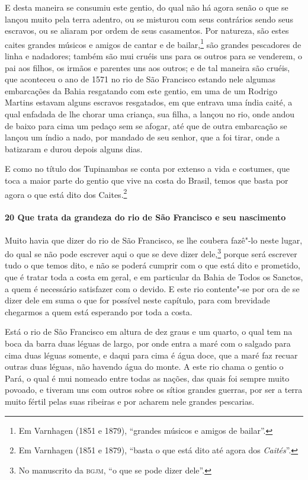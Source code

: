 \begin{linenumbers}
E desta maneira se consumiu este gentio, do qual não há agora senão o que se lançou muito
pela terra adentro, ou se misturou com seus contrários sendo seus escravos, ou se aliaram
por ordem de seus casamentos. Por natureza, são estes caites grandes músicos e amigos de
cantar e de bailar,\footnote{ Em Varnhagen (1851 e 1879), ``grandes músicos e amigos de
bailar''.} são grandes pescadores de linha e nadadores; também são mui cruéis uns para os
outros para se venderem, o pai aos filhos, os irmãos e parentes uns aos outros; e de tal
maneira são cruéis, que aconteceu o ano de 1571 no rio de São Francisco estando nele
algumas embarcações da Bahia resgatando com este gentio, em uma de um Rodrigo Martins
estavam alguns escravos resgatados, em que entrava uma índia caité, a qual enfadada de lhe
chorar uma criança, sua filha, a lançou no rio, onde andou de baixo para cima um pedaço
sem se afogar, até que de outra embarcação se lançou um índio a nado, por mandado de seu
senhor, que a foi tirar, onde a batizaram e durou depois alguns dias.

E como no título dos Tupinambas se conta por extenso a vida e costumes, que toca a maior
parte do gentio que vive na costa do Brasil, temos que basta por agora o que está dito dos
Caites.\footnote{ Em Varnhagen (1851 e 1879), ``basta o que está dito até agora dos
\textit{Caités}''.}

\paragraph{20 Que trata da grandeza do rio de São Francisco e seu nascimento} \quad
Muito havia que dizer do rio de São Francisco, se lhe coubera fazê"-lo neste lugar, do qual
se não pode escrever aqui o que se deve dizer dele,\footnote{ No manuscrito da
\textsc{bgjm}, ``o que se pode dizer dele''.} porque será escrever tudo o que temos dito,
e não se poderá cumprir com o que está dito e prometido, que é tratar toda a costa em
geral, e em particular da Bahia de Todos os Sanctos, a quem é necessário satisfazer com o
devido. E este rio contente"-se por ora de se dizer dele em suma o que for possível neste
capítulo, para com brevidade chegarmos a quem está esperando por toda a costa.

Está o rio de São Francisco em altura de dez graus e um quarto, o qual tem na boca da
barra duas léguas de largo, por onde entra a maré com o salgado para cima duas léguas
somente, e daqui para cima é água doce, que a maré faz recuar outras duas léguas, não
havendo água do monte. A este rio chama o gentio o Pará, o qual é mui nomeado entre todas
as nações, das quais foi sempre muito povoado, e tiveram uns com outros sobre os sítios
grandes guerras, por ser a terra muito fértil pelas suas ribeiras e por acharem nele
grandes pescarias.


\end{linenumbers}
